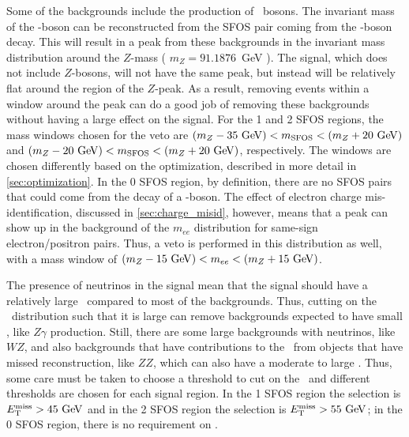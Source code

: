 Some of the backgrounds include the production of \z~bosons.
The invariant mass of the \z-boson can be reconstructed from the SFOS
pair coming from the \z-boson decay. 
This will result in a peak from these backgrounds
in the invariant mass distribution around 
the $Z$-mass ( $m_{Z}=91.1876$~GeV \cite{PDG:2014}).
The signal, which does not include $Z$-bosons, 
will not have the same peak, but instead
will be relatively flat around the region of the $Z$-peak. 
As a result, removing events within a window around the peak can do a good job
of removing these backgrounds without having a large effect on the signal.
For the 1 and 2 SFOS regions, the mass windows
chosen for the veto are $(m_Z-35\GeV )< m_{\textrm{SFOS}} < (m_Z+20\GeV)$
and $(m_Z-20\GeV )< m_{\textrm{SFOS}} < (m_Z+20\GeV)$, respectively.
The windows are chosen differently based on 
the optimization, described in more detail in \sec\ref{sec:optimization}.
In the 0 SFOS region, by definition, there are no SFOS pairs that could come 
from the decay of a \z-boson. 
The effect of electron charge mis-identification,
discussed in \sec\ref{sec:charge_misid}, however, means that a 
peak can show up in the background
of the $m_{ee}$ distribution for same-sign electron/positron pairs. 
Thus, a veto is performed in this distribution as well, with 
a mass window of $(m_Z-15\GeV) < m_{ee} < (m_Z+15\GeV)$.


The presence of neutrinos in the signal mean that the signal should have a 
relatively large \MET~compared to most of the backgrounds. Thus, 
cutting on the \MET~distribution such that it is large can remove backgrounds
expected to have small \MET, like $Z\gamma$ production.
Still, there are some large backgrounds with neutrinos, like $WZ$, 
and also backgrounds that have contributions to the \MET~from objects that have
missed reconstruction, like $ZZ$, which can also have a moderate to large \MET.
Thus, some care must be taken to choose a threshold to cut on the \MET~and
different thresholds are chosen for each signal 
region.
In the 1 SFOS region the selection is  $\MET > 45\GeV$
and in the 2 SFOS region the selection is $\MET > 55\GeV$;
in the 0 SFOS region, 
there is no requirement on \MET.

